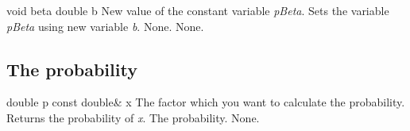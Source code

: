 \setNormalInstance
\printMethodWithOneParam
{void}
{beta}
{double}
{b}
{New value of the constant variable {\em pBeta}.}
{Sets the variable {\em pBeta} using new variable {\em b}.}
{None.}
{None.}

\vspace*{10mm}

\subsection{The probability}

\setConstInstance
\printMethodWithOneParam
{double}
{p}
{const double\&}
{x}
{The factor which you want to calculate the probability.}
{Returns the probability of {\em x}.}
{The probability.}
{None.}













